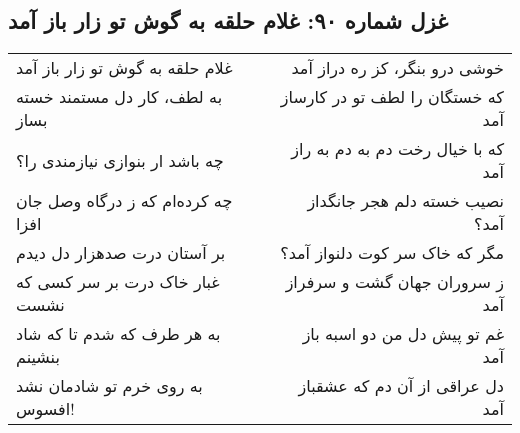 \begin{center}
\section*{غزل شماره ۹۰: غلام حلقه به گوش تو زار باز آمد}
\label{sec:090}
\begin{longtable}{l p{0.5cm} r}
غلام حلقه به گوش تو زار باز آمد
&&
خوشی درو بنگر، کز ره دراز آمد
\\
به لطف، کار دل مستمند خسته بساز
&&
که خستگان را لطف تو در کارساز آمد
\\
چه باشد ار بنوازی نیازمندی را؟
&&
که با خیال رخت دم به دم به راز آمد
\\
چه کرده‌ام که ز درگاه وصل جان افزا
&&
نصیب خسته دلم هجر جانگداز آمد؟
\\
بر آستان درت صدهزار دل دیدم
&&
مگر که خاک سر کوت دلنواز آمد؟
\\
غبار خاک درت بر سر کسی که نشست
&&
ز سروران جهان گشت و سرفراز آمد
\\
به هر طرف که شدم تا که شاد بنشینم
&&
غم تو پیش دل من دو اسبه باز آمد
\\
به روی خرم تو شادمان نشد افسوس!
&&
دل عراقی از آن دم که عشقباز آمد
\\
\end{longtable}
\end{center}
